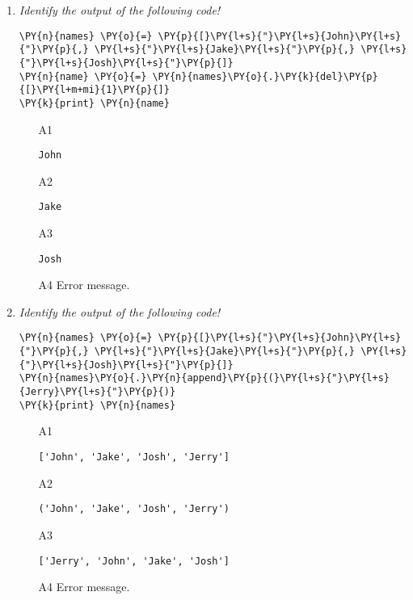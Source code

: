 \begin{enumerate}
\vspace{6mm}

\item {\em Identify the output of the following code!}\\

\begin{Verbatim}[commandchars=\\\{\}]
\PY{n}{names} \PY{o}{=} \PY{p}{[}\PY{l+s}{"}\PY{l+s}{John}\PY{l+s}{"}\PY{p}{,} \PY{l+s}{"}\PY{l+s}{Jake}\PY{l+s}{"}\PY{p}{,} \PY{l+s}{"}\PY{l+s}{Josh}\PY{l+s}{"}\PY{p}{]}
\PY{n}{name} \PY{o}{=} \PY{n}{names}\PY{o}{.}\PY{k}{del}\PY{p}{[}\PY{l+m+mi}{1}\PY{p}{]}
\PY{k}{print} \PY{n}{name}
\end{Verbatim}
\vspace{6mm}

\begin{enumerate}
\item[A1] 
\begin{verbatim}
John
\end{verbatim}
\item[A2] 
\begin{verbatim}
Jake
\end{verbatim}
\item[A3] 
\begin{verbatim}
Josh
\end{verbatim}
\item[A4] Error message.
\end{enumerate}

\vspace{6mm}

\item {\em Identify the output of the following code!}\\

\begin{Verbatim}[commandchars=\\\{\}]
\PY{n}{names} \PY{o}{=} \PY{p}{[}\PY{l+s}{"}\PY{l+s}{John}\PY{l+s}{"}\PY{p}{,} \PY{l+s}{"}\PY{l+s}{Jake}\PY{l+s}{"}\PY{p}{,} \PY{l+s}{"}\PY{l+s}{Josh}\PY{l+s}{"}\PY{p}{]}
\PY{n}{names}\PY{o}{.}\PY{n}{append}\PY{p}{(}\PY{l+s}{"}\PY{l+s}{Jerry}\PY{l+s}{"}\PY{p}{)}
\PY{k}{print} \PY{n}{names}
\end{Verbatim}
\vspace{6mm}

\begin{enumerate}
\item[A1] 
\begin{verbatim}
['John', 'Jake', 'Josh', 'Jerry']
\end{verbatim}
\item[A2] 
\begin{verbatim}
('John', 'Jake', 'Josh', 'Jerry')
\end{verbatim}
\item[A3] 
\begin{verbatim}
['Jerry', 'John', 'Jake', 'Josh']
\end{verbatim}
\item[A4] Error message.
\end{enumerate}


\end{enumerate}
